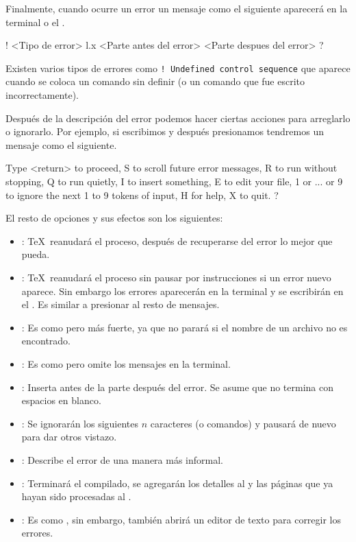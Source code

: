 Finalmente, cuando ocurre un error un mensaje como el siguiente aparecerá en la terminal o el .
\begin{texcode}
  ! <Tipo de error>
  l.x <Parte antes del error>
    <Parte despues del error>
  ?
\end{texcode}

Existen varios tipos de errores como \texttt{! Undefined control sequence} que aparece cuando se coloca un comando sin definir (o un comando que fue escrito incorrectamente).

Después de la descripción del error podemos hacer ciertas acciones para arreglarlo o ignorarlo. Por ejemplo, si escribimos  y después presionamos  tendremos un mensaje como el siguiente.
\begin{texcode}
  Type <return> to proceed, S to scroll future error messages,
  R to run without stopping, Q to run quietly,
  I to insert something, E to edit your file,
  1 or ... or 9 to ignore the next 1 to 9 tokens of input,
  H for help, X to quit.
  ?
\end{texcode}

El resto de opciones y sus efectos son los siguientes:
\begin{itemize}
  \item {}: \TeX\ reanudará el proceso, después de recuperarse del error lo mejor que pueda.

  \item {}: \TeX\ reanudará el proceso sin pausar por instrucciones si un error nuevo aparece. Sin embargo los errores aparecerán en la terminal y se escribirán en el . Es similar a presionar  al resto de mensajes.

  \item {}: Es como  pero más fuerte, ya que no parará si el nombre de un archivo no es encontrado.

  \item {}: Es como  pero omite los mensajes en la terminal.

  \item {}: Inserta  antes de la parte después del error. Se asume que  no termina con espacios en blanco.

  \item {}: Se ignorarán los siguientes $n$ caracteres (o comandos) y pausará de nuevo para dar otros vistazo.

  \item {}: Describe el error de una manera más informal.

  \item {}: Terminará el compilado, se agregarán los detalles al  y las páginas que ya hayan sido procesadas al .

  \item {}: Es como , sin embargo, también abrirá un editor de texto para corregir los errores.
\end{itemize}

